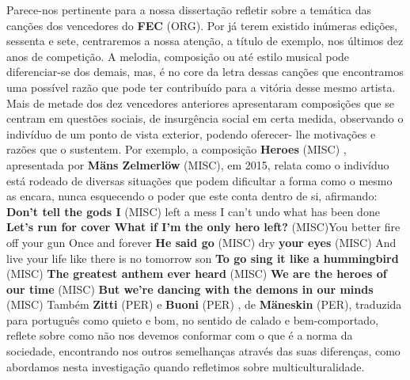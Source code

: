 \documentclass[12pt,a4paper]{article}
\begin{document}
Parece-nos  pertinente  para  a  nossa  dissertação  refletir  sobre  a  temática  das canções dos vencedores do \textbf{FEC} (ORG). Por já terem existido inúmeras edições, sessenta e sete, centraremos a nossa atenção, a título de exemplo, nos últimos dez anos de competição. A melodia, composição ou até estilo musical pode diferenciar-se dos demais, mas, é no core da  letra  dessas  canções  que  encontramos  uma  possível  razão  que  pode  ter  contribuído para  a  vitória  desse  mesmo  artista.  Mais  de  metade  dos  dez  vencedores  anteriores apresentaram composições que se centram em questões sociais, de insurgência social em certa medida, observando o indivíduo de um ponto de vista exterior, podendo oferecer- lhe motivações e razões que o sustentem. Por exemplo, a composição \textbf{Heroes} (MISC) , apresentada por  \textbf{Mäns  Zelmerlöw} (MISC), em  2015,  relata  como  o  indivíduo  está  rodeado  de  diversas situações que podem dificultar a forma como o mesmo  as encara, nunca esquecendo o poder que este conta dentro de si, afirmando: \textbf{Don't tell the gods I} (MISC) left a mess I can't undo what has been done \textbf{Let's run for cover What if I'm the only hero left?} (MISC)You better fire off your gun Once and forever \textbf{He said go} (MISC) dry \textbf{your eyes} (MISC) And live your life like there is no tomorrow son \textbf{To go sing it like a hummingbird} (MISC) \textbf{The greatest anthem ever heard} (MISC) \textbf{We are the heroes of our time} (MISC) \textbf{But we're dancing with the demons in our minds} (MISC) Também \textbf{Zitti} (PER) e \textbf{Buoni} (PER) , de \textbf{Mäneskin} (PER), traduzida para português como quieto e bom, no sentido de calado e bem-comportado, reflete sobre como não nos devemos conformar com o que é a norma da sociedade, encontrando nos outros semelhanças através das suas diferenças, como abordamos nesta investigação quando refletimos sobre multiculturalidade.
\end{document}
